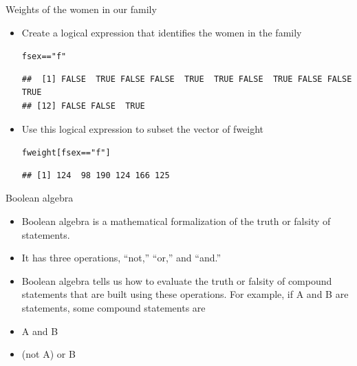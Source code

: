 \documentclass{beamer}\usepackage[]{graphicx}\usepackage[]{color}
\makeatletter
\newcommand{\hlstr}[1]{\textcolor[rgb]{0.192,0.494,0.8}{#1}}%
\newcommand{\hlopt}[1]{\textcolor[rgb]{0,0,0}{#1}}%
\newcommand{\hlstd}[1]{\textcolor[rgb]{0.345,0.345,0.345}{#1}}%
\newenvironment{kframe}{%
 \def\at@end@of@kframe{}%
 \ifinner\ifhmode%
  \def\at@end@of@kframe{\end{minipage}}%
  \begin{minipage}{\columnwidth}%
 \fi\fi%
 \def\FrameCommand##1{\hskip\@totalleftmargin \hskip-\fboxsep
 \colorbox{shadecolor}{##1}\hskip-\fboxsep
     \hskip-\linewidth \hskip-\@totalleftmargin \hskip\columnwidth}%
 \MakeFramed {\advance\hsize-\width
   \@totalleftmargin\z@ \linewidth\hsize
   \@setminipage}}%
 {\par\unskip\endMakeFramed%
 \at@end@of@kframe}
\newenvironment{knitrout}{}{} %
\renewenvironment{knitrout}{\begin{singlespace}}{\end{singlespace}}
\theoremstyle{mystyle}
\makeatother
\begin{document}
\begin{frame}[fragile]{Weights of the women in our family}
\begin{itemize}
\item Create a logical expression that identifies the women in the family
\begin{knitrout}
\color{fgcolor}\begin{kframe}
\begin{alltt}
\hlstd{fsex}\hlopt{==}\hlstr{"f"}
\end{alltt}
\begin{verbatim}
##  [1] FALSE  TRUE FALSE FALSE  TRUE  TRUE FALSE  TRUE FALSE FALSE  TRUE
## [12] FALSE FALSE  TRUE
\end{verbatim}
\end{kframe}
\end{knitrout}
\item Use this logical expression to subset the vector of fweight
\begin{knitrout}
\color{fgcolor}\begin{kframe}
\begin{alltt}
\hlstd{fweight[fsex}\hlopt{==}\hlstr{"f"}\hlstd{]}
\end{alltt}
\begin{verbatim}
## [1] 124  98 190 124 166 125
\end{verbatim}
\end{kframe}
\end{knitrout}
\end{itemize}
\end{frame}

\begin{frame}[fragile]{Boolean algebra}
\begin{itemize}
\item Boolean algebra is a mathematical formalization of the truth or falsity of statements.  
\item It has three operations, “not,” “or,” and “and.”  
\item Boolean algebra tells us how to evaluate the truth or falsity of compound statements that are built using these operations.  For example, if A and B are statements, some compound statements are
\item A and B
\item (not A) or B
\end{itemize}
\end{frame}
\end{document}
